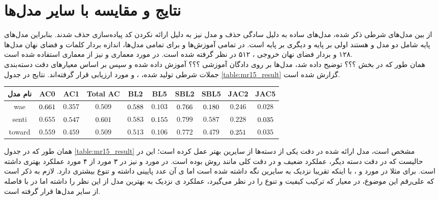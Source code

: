 \section{نتایج و مقایسه با سایر مدل‌ها}
از بین مدل‌های شرطی ذکر شده، مدل‌های ساده به دلیل سادگی حذف و مدل  نیز به دلیل ارائه نکردن کد پیاده‌سازی حذف شدند. بنابراین مدل‌های پایه شامل دو مدل \towardctg{} و \sentigan{} هستند اولی بر پایه \vae{} و دیگری بر پایه \gan{} است. در تمامی آموزش‌ها و برای تمامی مدل‌ها، اندازه بردار \embedding{} کلمات و فضای نهان مدل‌ها ۱۲۸ و بردار فضای نهان خروجی \encoder{}، ۵۱۲ در نظر گرفته شده است. در مورد معماری \encoder{} و \decoder{} نیز از معماری \transformer{} استفاده شده است.
\\
همان طور که در بخش ؟؟؟ توضیح داده شد، مدل‌ها بر روی دادگان آموزشی ؟؟؟ آموزش داده شده و سپس بر اساس معیارهای  دقت دسته‌بندی جملات شرطی تولید شده، \bleu{} ، \selfbleu{} و \jaccard{} مورد ارزیابی قرار گرفته‌اند. نتایج در جدول \ref{table:mr15_result} گزارش شده است.
\begin{table*}[!htb]
    \centering
    \caption{ارزیابی مدل‌های پایه و ارائه شده بر اساس معیار‌های مختلف}\label{table:mr15_result}
    \small\tabcolsep=0.07cm
    \begin{tabular}{||c||c c c|c c|c c|c c||}\hline\hline نام مدل	& AC0	& AC1	& Total AC	& BL2	& BL5	& SBL2	& SBL5	& JAC2	& JAC5\\
        \hline\hline
        wae	& $\cellcolor{gray!25}0.661$	& $0.357$	& $0.509$	& $\cellcolor{gray!25}0.588$	& $0.103$	& $\cellcolor{gray!25}0.766$	& $\cellcolor{gray!25}0.180$	& $0.246$	& $0.028$ \\
        \hline
        senti	& $0.655$	& $\cellcolor{gray!25}0.547$	& $\cellcolor{gray!25}0.601$	& $0.583$	& $\cellcolor{gray!25}0.155$	& $0.799$	& $0.587$	& $0.228$	& $\cellcolor{gray!25}0.035$ \\
        \hline
        toward	& $0.559$	& $0.459$	& $0.509$	& $0.513$	& $0.106$	& $0.772$	& $0.479$	& $\cellcolor{gray!25}0.251$	& $0.035$ \\
        \hline
        \hline\end{tabular}\normalsize 
\end{table*}
همان طور که در جدول \ref{table:mr15_result} مشخص است، مدل ارائه شده در دقت یکی از دسته‌ها از سایرین بهتر عمل کرده است؛ این در حالیست که در دقت دسته دیگر، عملکرد ضعیف و در دقت کلی مانند روش \towardctg{} بوده است. در مورد \bleu{} و \selfbleu{} نیز در ۳ مورد از ۴ مورد عملکرد بهتری داشته است. برای مثلا در مورد \bleu[-5]{} و \selfbleu[-5]{}، با اینکه \bleu{} تقریبا نزدیک به سایرین نگه داشته شده است اما \selfbleu{}ی آن عدد پایینی داشته و تنوع بیشتری دارد. لازم به ذکر است که علی‌رقم این موضوع، در معیار \jaccard{} که ترکیب کیفیت و تنوع را در نظر می‌گیرد، عملکرد \jaccard[-2]{}ی نزدیک به بهترین مدل از این نظر را داشته اما در \jaccard[-5]{} با فاصله از سایر مدل‌ها قرار گرفته است.

